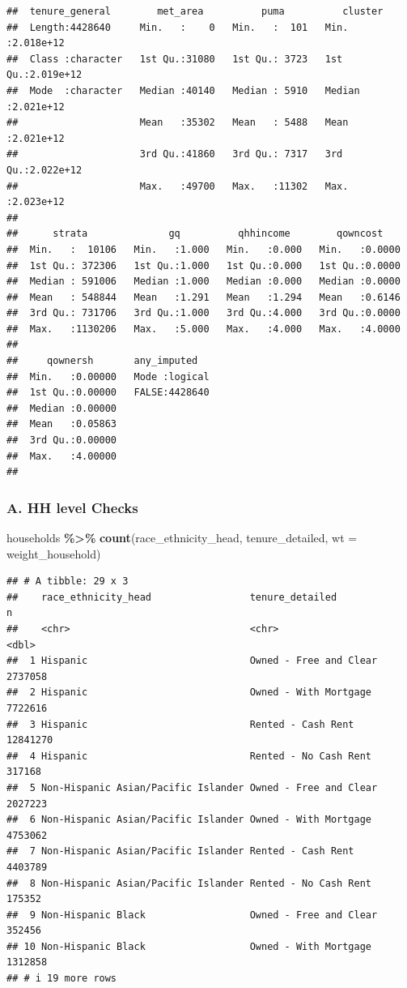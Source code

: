 \documentclass[
]{article}
\newenvironment{Shaded}{\begin{snugshade}}{\end{snugshade}}
\newcommand{\AttributeTok}[1]{\textcolor[rgb]{0.13,0.29,0.53}{#1}}
\newcommand{\FunctionTok}[1]{\textcolor[rgb]{0.13,0.29,0.53}{\textbf{#1}}}
\newcommand{\NormalTok}[1]{#1}
\newcommand{\SpecialCharTok}[1]{\textcolor[rgb]{0.81,0.36,0.00}{\textbf{#1}}}
\begin{document}
\begin{verbatim}
##  tenure_general        met_area          puma          cluster         
##  Length:4428640     Min.   :    0   Min.   :  101   Min.   :2.018e+12  
##  Class :character   1st Qu.:31080   1st Qu.: 3723   1st Qu.:2.019e+12  
##  Mode  :character   Median :40140   Median : 5910   Median :2.021e+12  
##                     Mean   :35302   Mean   : 5488   Mean   :2.021e+12  
##                     3rd Qu.:41860   3rd Qu.: 7317   3rd Qu.:2.022e+12  
##                     Max.   :49700   Max.   :11302   Max.   :2.023e+12  
##                                                                        
##      strata              gq          qhhincome        qowncost     
##  Min.   :  10106   Min.   :1.000   Min.   :0.000   Min.   :0.0000  
##  1st Qu.: 372306   1st Qu.:1.000   1st Qu.:0.000   1st Qu.:0.0000  
##  Median : 591006   Median :1.000   Median :0.000   Median :0.0000  
##  Mean   : 548844   Mean   :1.291   Mean   :1.294   Mean   :0.6146  
##  3rd Qu.: 731706   3rd Qu.:1.000   3rd Qu.:4.000   3rd Qu.:0.0000  
##  Max.   :1130206   Max.   :5.000   Max.   :4.000   Max.   :4.0000  
##                                                                    
##     qownersh       any_imputed    
##  Min.   :0.00000   Mode :logical  
##  1st Qu.:0.00000   FALSE:4428640  
##  Median :0.00000                  
##  Mean   :0.05863                  
##  3rd Qu.:0.00000                  
##  Max.   :4.00000                  
## 
\end{verbatim}

\subsubsection{A. HH level Checks}\label{a.-hh-level-checks}

\begin{Shaded}
\begin{Highlighting}[]
\NormalTok{households }\SpecialCharTok{\%\textgreater{}\%} \FunctionTok{count}\NormalTok{(race\_ethnicity\_head, tenure\_detailed, }\AttributeTok{wt =}\NormalTok{ weight\_household)}
\end{Highlighting}
\end{Shaded}

\begin{verbatim}
## # A tibble: 29 x 3
##    race_ethnicity_head                 tenure_detailed               n
##    <chr>                               <chr>                     <dbl>
##  1 Hispanic                            Owned - Free and Clear  2737058
##  2 Hispanic                            Owned - With Mortgage   7722616
##  3 Hispanic                            Rented - Cash Rent     12841270
##  4 Hispanic                            Rented - No Cash Rent    317168
##  5 Non-Hispanic Asian/Pacific Islander Owned - Free and Clear  2027223
##  6 Non-Hispanic Asian/Pacific Islander Owned - With Mortgage   4753062
##  7 Non-Hispanic Asian/Pacific Islander Rented - Cash Rent      4403789
##  8 Non-Hispanic Asian/Pacific Islander Rented - No Cash Rent    175352
##  9 Non-Hispanic Black                  Owned - Free and Clear   352456
## 10 Non-Hispanic Black                  Owned - With Mortgage   1312858
## # i 19 more rows
\end{verbatim}
\end{document}
